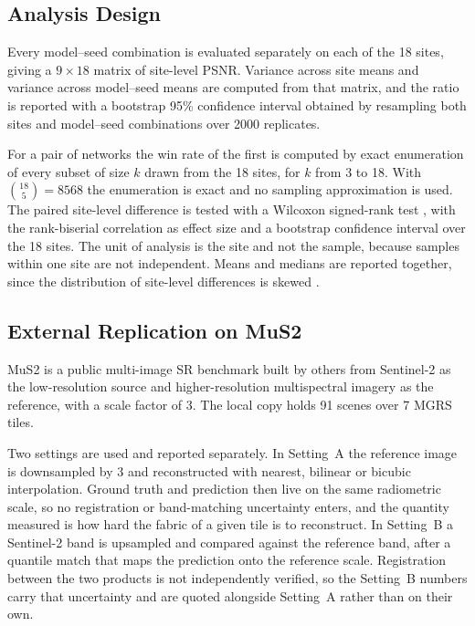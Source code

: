 \documentclass[journal]{IEEEtran}
\begin{document}
\subsection{Analysis Design}

Every model--seed combination is evaluated separately on each of the 18 sites,
giving a $9 \times 18$ matrix of site-level PSNR. Variance across site means and
variance across model--seed means are computed from that matrix, and the ratio is
reported with a bootstrap 95\% confidence interval obtained by resampling both
sites and model--seed combinations over 2000 replicates.

For a pair of networks the win rate of the first is computed by exact enumeration
of every subset of size $k$ drawn from the 18 sites, for $k$ from 3 to 18. With
$\binom{18}{5} = 8568$ the enumeration is exact and no sampling approximation is
used. The paired site-level difference is tested with a Wilcoxon signed-rank test
\cite{wilcoxon1945}, with the rank-biserial correlation as effect size and a
bootstrap confidence interval over the 18 sites. The unit of analysis is the site
and not the sample, because samples within one site are not independent. Means and
medians are reported together, since the distribution of site-level differences is
skewed \cite{lakens2017}.

\subsection{External Replication on MuS2}

MuS2 \cite{mus2} is a public multi-image SR benchmark built by others from
Sentinel-2 as the low-resolution source and higher-resolution multispectral
imagery as the reference, with a scale factor of 3. The local copy holds 91 scenes
over 7 MGRS tiles.

Two settings are used and reported separately. In Setting~A the reference image is
downsampled by 3 and reconstructed with nearest, bilinear or bicubic interpolation.
Ground truth and prediction then live on the same radiometric scale, so no
registration or band-matching uncertainty enters, and the quantity measured is how
hard the fabric of a given tile is to reconstruct. In Setting~B a Sentinel-2 band
is upsampled and compared against the reference band, after a quantile match that
maps the prediction onto the reference scale. Registration between the two products
is not independently verified, so the Setting~B numbers carry that uncertainty and
are quoted alongside Setting~A rather than on their own.
\end{document}
